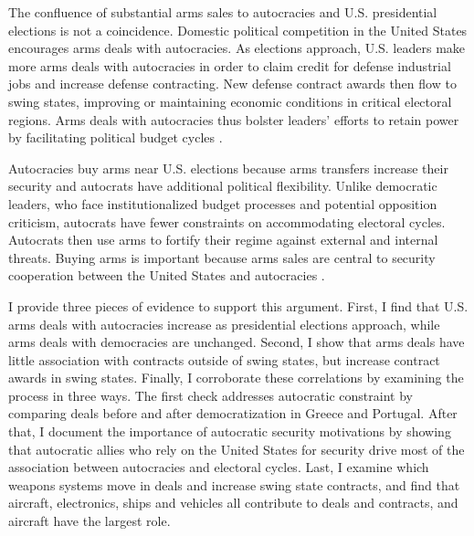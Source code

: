 \documentclass[12pt]{article}
\begin{document}
The confluence of substantial arms sales to autocracies and U.S. presidential elections is not a coincidence.
Domestic political competition in the United States encourages arms deals with autocracies. 
As elections approach, U.S. leaders make more arms deals with autocracies in order to claim credit for defense industrial jobs and increase defense contracting.
New defense contract awards then flow to swing states, improving or maintaining economic conditions in critical electoral regions.
Arms deals with autocracies thus bolster leaders' efforts to retain power by facilitating political budget cycles \citep{Tufte1978, Mintz1988, Mayer1995, DerouenHeo2000, Becker2021}. 


Autocracies buy arms near U.S. elections because arms transfers increase their security and autocrats have additional political flexibility. 
Unlike democratic leaders, who face institutionalized budget processes and potential opposition criticism, autocrats have fewer constraints on accommodating electoral cycles.
Autocrats then use arms to fortify their regime against external and internal threats.
Buying arms is important because arms sales are central to security cooperation between the United States and autocracies \citep{McManusYarhi-Milo2017}.



I provide three pieces of evidence to support this argument.
First, I find that U.S. arms deals with autocracies increase as presidential elections approach, while arms deals with democracies are unchanged. 
Second, I show that arms deals have little association with contracts outside of swing states, but increase contract awards in swing states. 
Finally, I corroborate these correlations by examining the process in three ways.
The first check addresses autocratic constraint by comparing deals before and after democratization in Greece and Portugal. 
After that, I document the importance of autocratic security motivations by showing that autocratic allies who rely on the United States for security drive most of the association between autocracies and electoral cycles. 
Last, I examine which weapons systems move in deals and increase swing state contracts, and find that aircraft, electronics, ships and vehicles all contribute to deals and contracts, and aircraft have the largest role. 
\end{document}
